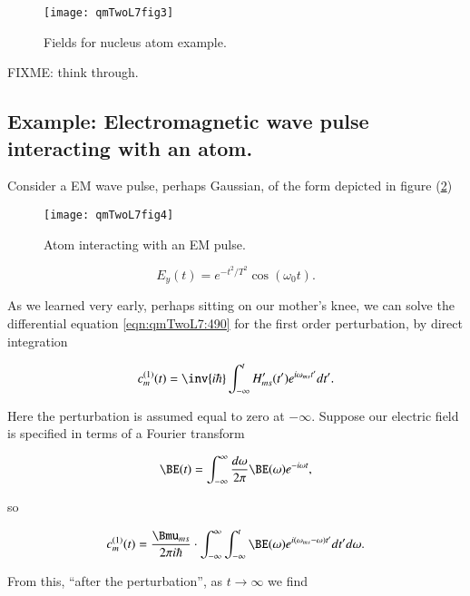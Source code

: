 \begin{figure}[htp]
\centering
\texttt{[image: qmTwoL7fig3]}
\caption{Fields for nucleus atom example.}\label{fig:qmTwoL7fig3}
\end{figure}

FIXME: think through.

\subsection{Example: Electromagnetic wave pulse interacting with an atom.}

Consider a EM wave pulse, perhaps Gaussian, of the form depicted in figure (\ref{fig:qmTwoL7fig4})

\begin{figure}[htp]
\centering
\texttt{[image: qmTwoL7fig4]}
\caption{Atom interacting with an EM pulse.}\label{fig:qmTwoL7fig4}
\end{figure}

\begin{equation}\label{eqn:qmTwoL7:590}
E_y(t) = e^{-t^2/T^2} \cos(\omega_0 t).
\end{equation}

As we learned very early, perhaps sitting on our mother's knee, we can solve the differential equation \ref{eqn:qmTwoL7:490} for the first order perturbation, by direct integration

\begin{equation}\label{eqn:qmTwoL7:510}
c_m^{(1)}(t) =
\inv{i \hbar} \int_{-\infty}^t
H_{ms}'(t') e^{i \omega_{ms} t'} dt'.
\end{equation}

Here the perturbation is assumed equal to zero at $-\infty$.  Suppose our electric field is specified in terms of a Fourier transform

\begin{equation}\label{eqn:qmTwoL7:530}
\BE(t) = \int_{-\infty}^\infty \frac{d \omega}{2\pi} \BE(\omega) e^{-i \omega t},
\end{equation}

so

\begin{equation}\label{eqn:qmTwoL7:550}
c_m^{(1)}(t) =
\frac{\Bmu_{ms}}{2 \pi i \hbar} \cdot
\int_{-\infty}^\infty
\int_{-\infty}^t
\BE(\omega)
e^{i (\omega_{ms} -\omega) t'} dt' d\omega.
\end{equation}

From this, ``after the perturbation'', as $t \rightarrow \infty$ we find

